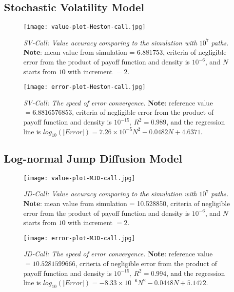 \subsection{Stochastic Volatility Model}
\begin{figure}[H]
    \centering
    \texttt{[image: value-plot-Heston-call.jpg]}
    \caption[\emph{SV-Call: Value accuracy comparing to the simulation with} $10^7$ \emph{paths.}]{\emph{SV-Call: Value accuracy comparing to the simulation with} $10^7$ \emph{paths.} \textbf{Note}: mean value from simulation = 6.881753, criteria of negligible error from the product of payoff function and density is $10^{-6}$, and $N$ starts from $10$  with increment $=2$.}
    
    \label{fig:label}
\end{figure}

\begin{figure}[H]
    \centering
    \texttt{[image: error-plot-Heston-call.jpg]}
    \caption[\emph{SV-Call: The speed of error convergence.}]{\emph{SV-Call: The speed of error convergence.} \textbf{Note}: reference value $=6.8816576853$, criteria of negligible error from the product of payoff function and density is $10^{-15}$, $R^2=0.989$, and the regression line is $log_{10}\left(|Error|\right) = 7.26\times 10^{-5}N^2-0.0482N+4.6371$.}
    \label{fig:label}
\end{figure}




\subsection{Log-normal Jump Diffusion Model}
\begin{figure}[H]
    \centering
    \texttt{[image: value-plot-MJD-call.jpg]}
    \caption[\emph{JD-Call: Value accuracy comparing to the simulation with}]{\emph{JD-Call: Value accuracy comparing to the simulation with} $10^7$ \emph{paths.} \textbf{Note}: mean value from simulation = 10.528850, criteria of negligible error from the product of payoff function and density is $10^{-6}$, and $N$ starts from $10$  with increment $=2$.}
    
    \label{fig:label}
\end{figure}

\begin{figure}[H]
    \centering
    \texttt{[image: error-plot-MJD-call.jpg]}
    \caption[\emph{JD-Call: The speed of error convergence.}]{\emph{JD-Call: The speed of error convergence.} \textbf{Note}: reference value $=10.5281599666$, criteria of negligible error from the product of payoff function and density is $10^{-15}$, $R^2=0.994$, and the regression line is $log_{10}\left(|Error|\right) = -8.33\times 10^{-6}N^2-0.0448N+5.1472$.}

    \label{fig:label}
\end{figure}



